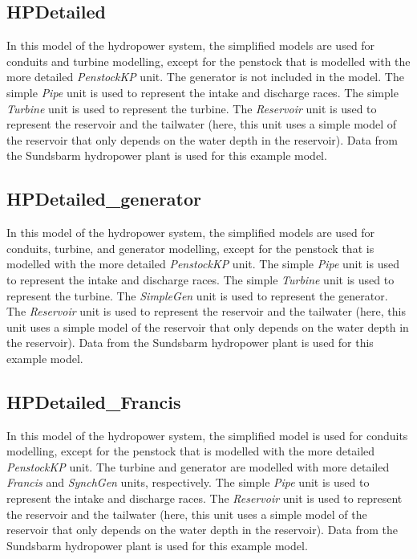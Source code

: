 \documentclass[%
]{USN-PhD}
\begin{document}
\subsection{HPDetailed}

In this model of the hydropower system, the simplified models are used for conduits and turbine modelling, except for the penstock that is modelled with the more detailed \emph{PenstockKP} unit. The generator is not included in the model. The simple \emph{Pipe} unit is used to represent the intake and discharge races. The simple \emph{Turbine} unit is used to represent the turbine. The \emph{Reservoir} unit is used to represent the reservoir and the tailwater (here, this unit uses a simple model of the reservoir that only depends on the water depth in the reservoir). Data from the Sundsbarm hydropower plant is used for this example model.

\subsection{HPDetailed\_generator}

In this model of the hydropower system, the simplified models are used for conduits, turbine, and generator modelling, except for the penstock that is modelled with the more detailed \emph{PenstockKP} unit. The simple \emph{Pipe} unit is used to represent the intake and discharge races. The simple \emph{Turbine} unit is used to represent the turbine. The \emph{SimpleGen} unit is used to represent the generator. The \emph{Reservoir} unit is used to represent the reservoir and the tailwater (here, this unit uses a simple model of the reservoir that only depends on the water depth in the reservoir). Data from the Sundsbarm hydropower plant is used for this example model.

\subsection{HPDetailed\_Francis}

In this model of the hydropower system, the simplified model is used for conduits modelling, except for the penstock that is modelled with the more detailed \emph{PenstockKP} unit. The turbine and generator are modelled with more detailed \emph{Francis} and \emph{SynchGen} units, respectively. The simple \emph{Pipe} unit is used to represent the intake and discharge races. The \emph{Reservoir} unit is used to represent the reservoir and the tailwater (here, this unit uses a simple model of the reservoir that only depends on the water depth in the reservoir). Data from the Sundsbarm hydropower plant is used for this example model.
\end{document}
